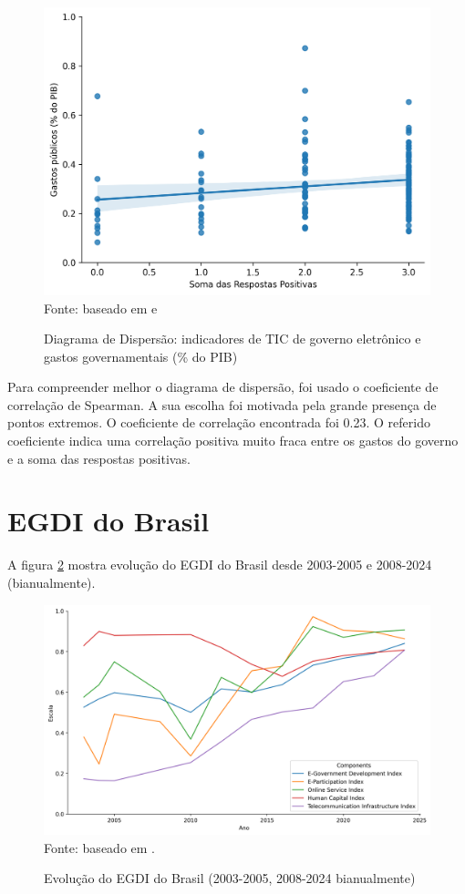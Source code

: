 \begin{figure}[H]
	\centering
	\caption{Diagrama de Dispersão: indicadores de TIC de governo eletrônico e gastos governamentais (\% do PIB)}
	\includegraphics[width=1\linewidth]{figuras/egdi/dispersao_ticegov_govexpenditure}
	\label{fig:dispersao_ticegov_govexpenditure}
	\footnotesize{Fonte: baseado em \cite{FMI_gov_expenditure} e \cite{ONU_ICT_in_government_indicators}}
\end{figure}

Para compreender melhor o diagrama de dispersão, foi usado o coeficiente de correlação de Spearman. A sua escolha foi motivada pela grande presença de pontos extremos. O coeficiente de correlação encontrada foi 0.23. O referido coeficiente indica uma correlação positiva muito fraca entre os gastos do governo e a soma das respostas positivas. 


\section{EGDI do Brasil}

A figura \ref{fig:lineplot_egdi_brasil} mostra evolução do EGDI do Brasil desde 2003-2005 e 2008-2024 (bianualmente).

\begin{figure}[H]
	\centering
	\caption{Evolução do EGDI do Brasil (2003-2005, 2008-2024 bianualmente)}
	\includegraphics[width=1\linewidth]{figuras/egdi/lineplot_egdi_brasil.png}
	\label{fig:lineplot_egdi_brasil}
	\footnotesize{Fonte: baseado em \cite{ONU_EGDI_mapa}.}
\end{figure}

